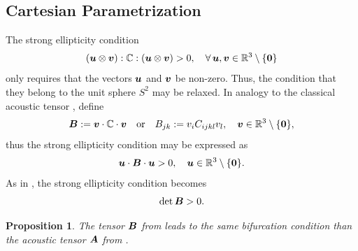 \documentclass[12pt]{article}
\newtheorem{proposition}{Proposition}
\numberwithin{equation}{section}
\begin{document}
\subsection{Cartesian Parametrization}
\label{subsec:Cartesian}

The strong ellipticity condition
\begin{equation}
  ({\boldsymbol{u}} \otimes {\boldsymbol{v}}) : \mathbb{C} : ({\boldsymbol{u}} \otimes {\boldsymbol{v}}) > 0,
  \quad
  \forall \, {\boldsymbol{u}}, {\boldsymbol{v}} \in \mathbb{R}^3 \setminus \{\mathbf{0}\}
\end{equation}
only requires that the vectors ${\boldsymbol{u}}$ and ${\boldsymbol{v}}$ be non-zero. Thus, the
condition that they belong to the unit sphere $S^2$ may be relaxed. In
analogy to the classical acoustic tensor ,
define
\begin{equation} \label{eq:Cartesian-acoustic-tensor}
  {\boldsymbol{B}} := {\boldsymbol{v}} \cdot \mathbb{C} \cdot {\boldsymbol{v}}
  \quad \text{or} \quad
  B_{jk} := v_i C_{ijkl} v_l,
  \quad
  {\boldsymbol{v}} \in \mathbb{R}^3 \setminus \{\mathbf{0}\},
\end{equation}
thus the strong ellipticity condition may be expressed as
\begin{equation} \label{eq:Cartesian-acoustic-ellipticity}
  {\boldsymbol{u}} \cdot {\boldsymbol{B}} \cdot {\boldsymbol{u}} > 0,
  \quad
  {\boldsymbol{u}} \in \mathbb{R}^3 \setminus \{\mathbf{0}\}.
\end{equation}
As in , the strong ellipticity
condition becomes
\begin{equation} \label{Cartesian-acoustic-determinant}
  \det {\boldsymbol{B}} > 0.
\end{equation}

\begin{proposition}
  The tensor ${\boldsymbol{B}}$ from  leads to
  the same bifurcation condition than the acoustic tensor ${\boldsymbol{A}}$ from
  .
\end{proposition}
\end{document}
